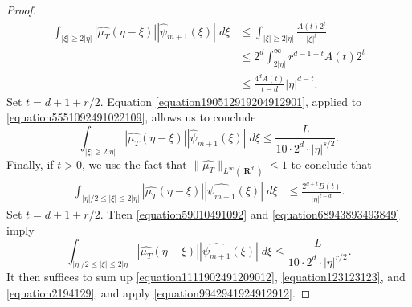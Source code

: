 \documentclass[12pt,reqno]{article}
\numberwithin{equation}{section}
\DeclareMathOperator{\RR}{\mathbf{R}}
\begin{document}
\begin{proof}
\begin{equation}
    \begin{split}
        \int_{|\xi| \geq 2|\eta|} |\widehat{\mu_T}(\eta - \xi)| |\widehat{\psi}_{m+1}(\xi)|\; d\xi &\leq \int_{|\xi| \geq 2|\eta|} \frac{A(t) 2^t}{|\xi|^t}\\
        &\leq 2^d \int_{2|\eta|}^\infty r^{d-1 - t} A(t) 2^t\\
        &\leq \frac{4^d A(t)}{t - d} |\eta|^{d-t}.
    \end{split}
    \end{equation}
    Set $t = d + 1 + r/2$. Equation \eqref{equation190512919204912901}, applied to \eqref{equation5551092491022109}, allows us to conclude
    \begin{equation} \label{equation123123123}
        \int_{|\xi| \geq 2|\eta|} |\widehat{\mu_T}(\eta - \xi)| |\widehat{\psi}_{m+1}(\xi)|\; d\xi \leq \frac{L}{10 \cdot 2^d \cdot |\eta|^{s/2}}.
    \end{equation}
    Finally, if $t > 0$, we use the fact that $\| \widehat{\mu_T} \|_{L^\infty(\RR^d)} \leq 1$ to conclude that
    \begin{equation} \label{equation59010491092}
    \begin{split}
        \int_{|\eta|/2 \leq |\xi| \leq 2|\eta|} |\widehat{\mu_T}(\eta - \xi)| |\widehat{\psi_{m+1}}(\xi)|\; d\xi &\leq \frac{2^{d+t} B(t)}{|\eta|^{t-d}}.
    \end{split}
    \end{equation}
    Set $t = d + 1 + r/2$. Then \eqref{equation59010491092} and \eqref{equation68943893493849} imply
    \begin{equation} \label{equation2194129}
        \int_{|\eta|/2 \leq |\xi| \leq 2|\eta} |\widehat{\mu_T}(\eta - \xi)| |\widehat{\psi_{m+1}}(\xi)|\; d\xi \leq \frac{L}{10 \cdot 2^d \cdot |\eta|^{r/2}}.
    \end{equation}
    It then suffices to sum up \eqref{equation1111902491209012}, \eqref{equation123123123}, and \eqref{equation2194129}, and apply \eqref{equation9942941924912912}.
\end{proof}
\end{document}
